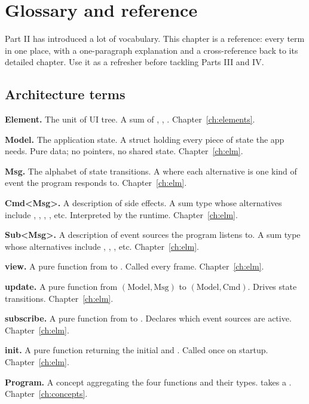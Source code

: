 \chapter{Glossary and reference}
\label{ch:glossary}

\begin{aside}
Part II has introduced a lot of vocabulary. This chapter is a
reference: every term in one place, with a one-paragraph
explanation and a cross-reference back to its detailed chapter.
Use it as a refresher before tackling Parts III and IV.
\end{aside}

\section{Architecture terms}

\textbf{Element.} The unit of UI tree. A sum of
, , .
Chapter~\ref{ch:elements}.

\textbf{Model.} The application state. A struct holding every
piece of state the app needs. Pure data; no pointers, no
shared state. Chapter~\ref{ch:elm}.

\textbf{Msg.} The alphabet of state transitions. A
 where each alternative is one kind of
event the program responds to. Chapter~\ref{ch:elm}.

\textbf{Cmd<Msg>.} A description of side effects. A sum type
whose alternatives include , ,
, , etc. Interpreted by the runtime.
Chapter~\ref{ch:elm}.

\textbf{Sub<Msg>.} A description of event sources the program
listens to. A sum type whose alternatives include ,
, , etc. Chapter~\ref{ch:elm}.

\textbf{view.} A pure function from  to
. Called every frame. Chapter~\ref{ch:elm}.

\textbf{update.} A pure function from
$(\text{Model}, \text{Msg})$ to $(\text{Model}, \text{Cmd})$.
Drives state transitions. Chapter~\ref{ch:elm}.

\textbf{subscribe.} A pure function from  to
. Declares which event sources are active.
Chapter~\ref{ch:elm}.

\textbf{init.} A pure function returning the initial
 and . Called once on startup.
Chapter~\ref{ch:elm}.

\textbf{Program.} A concept aggregating the four functions
and their types.  takes a .
Chapter~\ref{ch:concepts}.

